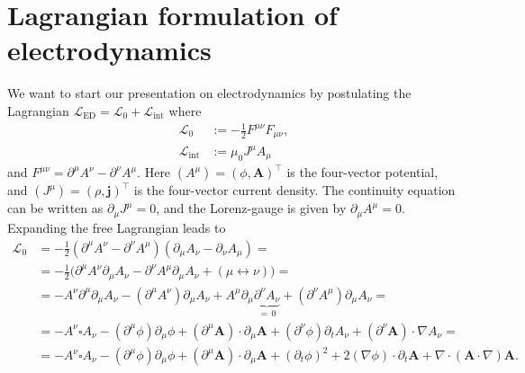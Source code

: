 \documentclass[english, parskip=full]{scrartcl}
\title{\titel}
\author{\autor}
\date{\today}
\newcommand{\kla}{}
\newcommand{\tecxt}{}
\begin{document}
\maketitle  %

\section{Lagrangian formulation of electrodynamics}
We want to start our presentation on electrodynamics by postulating the Lagrangian $\mathcal{L}_\tecxt\text{ED} = \mathcal{L}_0 + \mathcal{L}_\tecxt\text{int}$ where
\begin{align}
\mathcal{L}_0 &:= -\frac{1}{2} F^{\mu\nu}F_{\mu\nu},\\
\mathcal{L}_\tecxt\text{int} &:= \mu_0 J^\mu A_\mu
\end{align}
and $F^{\mu\nu} = \partial^\mu A^\nu - \partial^\nu A^\mu$.
Here $(A^\mu) = (\phi, \textbf{A})^\top$ is the four-vector potential, and $(J^\mu) = (\rho, \mathbf{j})^\top$ is the four-vector current density.
The continuity equation can be written as $\partial_\mu J^\mu =0$, and the Lorenz-gauge is given by $\partial_\mu A^\mu=0$.
Expanding the free Lagrangian leads to
\begin{align}
\mathcal{L}_0 &= -\frac{1}{2} \kla\left( \partial^\mu A^\nu - \partial^\nu A^\mu \right) \kla\left( \partial_\mu A_\nu - \partial_\nu A_\mu \right) = \\
&= -\frac{1}{2}\kla\big( \partial^\mu A^\nu\partial_\mu A_\nu - \partial^\nu A^\mu \partial_\mu A_\nu + (\mu\leftrightarrow\nu) \big) = \\
&= -A^\nu \partial^\mu \partial_\mu A_\nu - \kla\left( \partial^\mu A^\nu \right) \partial_\mu A_\nu + A^\mu \partial_\mu \underbrace{\partial^\nu A_\nu}_{=\,0} + \kla\left( \partial^\nu A^\mu  \right) \partial_\mu A_\nu = \\
&= -A^\nu \square A_\nu - \kla\left( \partial^\mu \phi \right) \partial_\mu \phi + \kla\left( \partial^\mu \textbf{A} \right) \cdot \partial_\mu \textbf{A} + \kla\left( \partial^\nu\phi \right)\partial_t A_\nu + \kla\left( \partial^\nu \textbf{A} \right) \cdot \nabla A_\nu = \\
&= -A^\nu \square A_\nu  - \kla\left( \partial^\mu \phi \right) \partial_\mu \phi + \kla\left( \partial^\mu \textbf{A} \right) \cdot  \partial_\mu \textbf{A} + (\partial_t\phi)^2 + 2(\nabla \phi)  \cdot \partial_t\textbf{A} + \nabla \cdot \kla\left( \textbf{A}\cdot\nabla \right) \textbf{A}.
\end{align}
\end{document}
